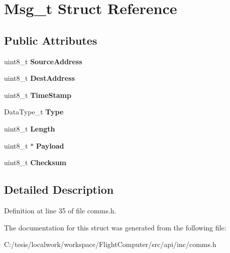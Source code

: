 \hypertarget{struct_msg__t}{\section{\-Msg\-\_\-t \-Struct \-Reference}
\label{struct_msg__t}
}
\subsection*{\-Public \-Attributes}
\begin{DoxyCompactItemize}
\item 
\hypertarget{struct_msg__t_a2702a9ea8efde19c2d2f19af740367ee}{uint8\-\_\-t {\bfseries \-Source\-Address}}\label{struct_msg__t_a2702a9ea8efde19c2d2f19af740367ee}

\item 
\hypertarget{struct_msg__t_a82889cba39ff7dea89ee38a8d87b0376}{uint8\-\_\-t {\bfseries \-Dest\-Address}}\label{struct_msg__t_a82889cba39ff7dea89ee38a8d87b0376}

\item 
\hypertarget{struct_msg__t_a663f2f776b5640895fba89d6c24a07ec}{uint8\-\_\-t {\bfseries \-Time\-Stamp}}\label{struct_msg__t_a663f2f776b5640895fba89d6c24a07ec}

\item 
\hypertarget{struct_msg__t_a592d7852d0b6e27e97fb4ee7eb5fa615}{\-Data\-Type\-\_\-t {\bfseries \-Type}}\label{struct_msg__t_a592d7852d0b6e27e97fb4ee7eb5fa615}

\item 
\hypertarget{struct_msg__t_a9ab00ecdf8e967d86e23245967b5c3ea}{uint8\-\_\-t {\bfseries \-Length}}\label{struct_msg__t_a9ab00ecdf8e967d86e23245967b5c3ea}

\item 
\hypertarget{struct_msg__t_a3f9b3e29b28aca8873fc32a7ffbcca55}{uint8\-\_\-t $\ast$ {\bfseries \-Payload}}\label{struct_msg__t_a3f9b3e29b28aca8873fc32a7ffbcca55}

\item 
\hypertarget{struct_msg__t_a27f51e91b1ffcd69d62b1feda093e138}{uint8\-\_\-t {\bfseries \-Checksum}}\label{struct_msg__t_a27f51e91b1ffcd69d62b1feda093e138}

\end{DoxyCompactItemize}


\subsection{\-Detailed \-Description}


\-Definition at line 35 of file comms.\-h.



\-The documentation for this struct was generated from the following file\-:\begin{DoxyCompactItemize}
\item 
\-C\-:/tesis/localwork/workspace/\-Flight\-Computer/src/api/inc/comms.\-h\end{DoxyCompactItemize}
